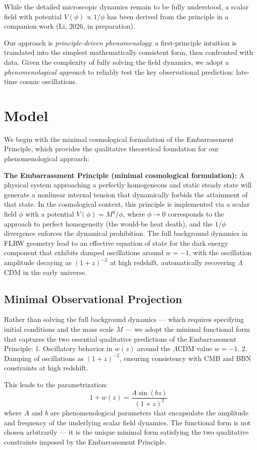 \documentclass[10pt,twocolumn]{article}
\begin{document}
While the detailed microscopic dynamics remain to be fully understood,
a scalar field with potential $V(\phi)\propto 1/\phi$ has been derived
from the principle in a companion work (Li, 2026, in preparation).

Our approach is \emph{principle-driven phenomenology}: a first-principle intuition is translated into the simplest mathematically consistent form, then confronted with data.
Given the complexity of fully solving the field dynamics,
we adopt a \emph{phenomenological approach} to reliably test
the key observational prediction: late-time cosmic oscillations.

\section{Model}
We begin with the minimal cosmological formulation of the Embarrassment Principle, which provides the qualitative theoretical foundation for our phenomenological approach:

\textbf{The Embarrassment Principle (minimal cosmological formulation):}
A physical system approaching a perfectly homogeneous and static steady state will generate a nonlinear internal tension that dynamically forbids the attainment of that state. In the cosmological context, this principle is implemented via a scalar field $\phi$ with a potential $V(\phi) = M^4/\phi$, where $\phi \to 0$ corresponds to the approach to perfect homogeneity (the would-be heat death), and the $1/\phi$ divergence enforces the dynamical prohibition. The full background dynamics in FLRW geometry lead to an effective equation of state for the dark energy component that exhibits damped oscillations around $w = -1$, with the oscillation amplitude decaying as $(1+z)^{-2}$ at high redshift, automatically recovering $\Lambda$CDM in the early universe.

\subsection{Minimal Observational Projection}
Rather than solving the full background dynamics — which requires specifying initial conditions and the mass scale $M$ — we adopt the minimal functional form that captures the two essential qualitative predictions of the Embarrassment Principle:
1. Oscillatory behavior in $w(z)$ around the $\Lambda$CDM value $w = -1$.
2. Damping of oscillations as $(1+z)^{-2}$, ensuring consistency with CMB and BBN constraints at high redshift.

This leads to the parametrization:
\[
\boxed{
1+w(z) = \frac{A\sin(bz)}{(1+z)^2}
}
\]
where $A$ and $b$ are phenomenological parameters that encapsulate the amplitude and frequency of the underlying scalar field dynamics. The functional form is not chosen arbitrarily — it is the unique minimal form satisfying the two qualitative constraints imposed by the Embarrassment Principle.
\end{document}
